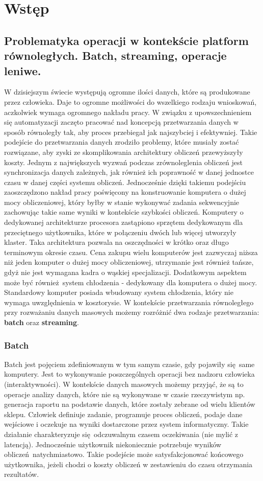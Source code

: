 \chapter{Wstęp} \label{chap.introduction}

\section{Problematyka operacji w kontekście platform równoległych. Batch, streaming, operacje leniwe.}
W dzisiejszym świecie występują ogromne ilości danych, które są produkowane przez człowieka. Daje to ogromne możliwości do wszelkiego rodzaju wnioskowań, aczkolwiek wymaga ogromnego nakładu pracy. W związku z upowszechnieniem się automatyzacji zaczęto pracować nad koncepcją przetwarzania danych w sposób równoległy tak, aby proces przebiegał jak najszybciej i efektywniej. Takie podejście do przetwarzania danych zrodziło problemy, które musiały zostać rozwiązane, aby zyski ze skomplikowania architektury obliczeń przewyższyły koszty. Jednym z największych wyzwań podczas zrównoleglenia obliczeń jest synchronizacja danych zależnych, jak również ich poprawność w danej jednostce czasu w danej części systemu obliczeń. Jednocześnie dzięki takiemu podejściu zaoszczędzono nakład pracy poświęcony na konstruowanie komputera o dużej mocy obliczeniowej, który byłby w stanie wykonywać zadania sekwencyjnie zachowując takie same wyniki w kontekście szybkości obliczeń. Komputery o dedykowanej architekturze procesora zastąpiono sprzętem dedykowanym dla przeciętnego użytkownika, które w połączeniu dwóch lub więcej utworzyły klaster. Taka architektura pozwala na oszczędności w krótko oraz długo terminowym okresie czasu. Cena zakupu wielu komputerów jest zazwyczaj niższa niż jeden komputer o dużej mocy obliczeniowej, utrzymanie jest również tańsze, gdyż nie jest wymagana kadra o wąskiej specjalizacji. Dodatkowym aspektem może być również system chłodzenia - dedykowany dla komputera o dużej mocy. Standardowy komputer posiada wbudowany system chłodzenia, który nie wymaga uwzględnienia w kosztorysie. W kontekście przetwarzania równoległego przy rozważaniu danych masowych możemy rozróżnić dwa rodzaje przetwarzania: \textbf{batch} oraz \textbf{streaming}.
\subsection{Batch}\label{batch_subsection}
Batch jest pojęciem zdefiniowanym w tym samym czasie, gdy pojawiły się same komputery. Jest to wykonywanie poszczególnych operacji bez nadzoru człowieka (interaktywności). W kontekście danych masowych możemy przyjąć, że są to operacje analizy danych, które nie są wykonywane w czasie rzeczywistym np. generacja raportu na podstawie danych, które zostały zebrane od wielu klientów sklepu. Człowiek definiuje zadanie, programuje proces obliczeń, podaje dane wejściowe i oczekuje na wyniki dostarczone przez system informatyczny. Takie działanie charakteryzuje się odczuwalnym czasem oczekiwania (nie mylić z latencją). Jednocześnie użytkownik niekoniecznie potrzebuje wyników obliczeń natychmiastowo. Takie podejście może satysfakcjonować końcowego użytkownika, jeżeli chodzi o koszty obliczeń w zestawieniu do czasu otrzymania rezultatów.
